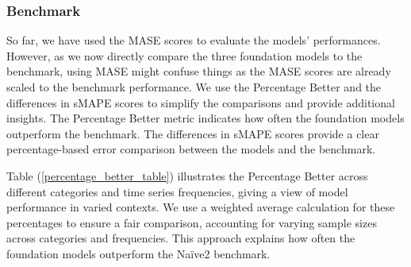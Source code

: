 \documentclass[12pt,a4paper]{article}
\begin{document}
\subsubsection{Benchmark}

So far, we have used the MASE scores to evaluate the models’ performances. However, as we now directly compare the three foundation models to the benchmark, using MASE might confuse things as the MASE scores are already scaled to the benchmark performance. We use the Percentage Better and the differences in sMAPE scores to simplify the comparisons and provide additional insights. The Percentage Better metric indicates how often the foundation models outperform the benchmark. The differences in sMAPE scores provide a clear percentage-based error comparison between the models and the benchmark. 

Table (\ref{percentage_better_table}) illustrates the Percentage Better across different categories and time series frequencies, giving a view of model performance in varied contexts. We use a weighted average calculation for these percentages to ensure a fair comparison, accounting for varying sample sizes across categories and frequencies. This approach explains how often the foundation models outperform the Naïve2 benchmark.
\end{document}
